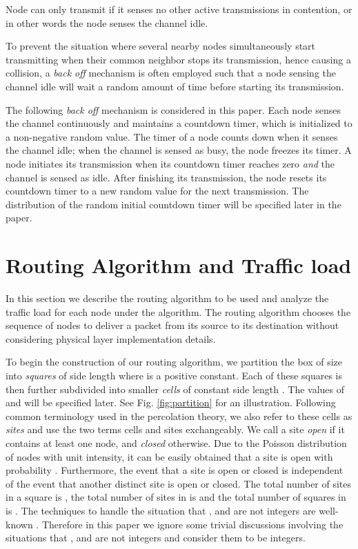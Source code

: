 \documentclass[english]{IEEEtran}
\theoremstyle{plain}
\theoremstyle{plain}
\theoremstyle{plain}
\theoremstyle{remark}
\begin{document}
Node  can only transmit if it senses no other active transmissions
in contention, or in other words the node senses the channel idle. 

To prevent the situation where several nearby nodes simultaneously
start transmitting when their common neighbor stops its transmission,
hence causing a collision, a \emph{back off} mechanism is often employed
such that a node sensing the channel idle will wait a random amount
of time before starting its transmission. 

The following \emph{back off} mechanism is considered in this paper.
Each node senses the channel continuously and maintains a countdown
timer, which is initialized to a non-negative random value. The timer
of a node counts down when it senses the channel idle; when the channel
is sensed as busy, the node freezes its timer. A node initiates its
transmission when its countdown timer reaches zero \emph{and} the
channel is sensed as idle. After finishing its transmission, the node
resets its countdown timer to a new random value for the next transmission.
The distribution of the random initial countdown timer will be specified
later in the paper.


\section{Routing Algorithm and Traffic load\label{sec:Routing Scheme}}

In this section we describe the routing algorithm to be used and analyze
the traffic load for each node under the algorithm. The routing algorithm
chooses the sequence of nodes to deliver a packet from its source
to its destination without considering physical layer implementation
details.

To begin the construction of our routing algorithm, we partition the
box  of size  into \emph{squares}
of side length  where  is a positive constant.
Each of these squares is then further subdivided into smaller \emph{cells}
of constant side length . The values of  and  will
be specified later. See Fig. \ref{fig:partition} for an illustration.
Following common terminology used in the percolation theory, we also
refer to these cells as \emph{sites} and use the two terms cells and
sites exchangeably. We call a site \emph{open} if it contains at least
one node, and \emph{closed} otherwise. Due to the Poisson distribution
of nodes with unit intensity, it can be easily obtained that a site
is open with probability . Furthermore,
the event that a site is open or closed is independent of the event
that another distinct site is open or closed. The total number of
sites in a square is , the
total number of sites in  is 
and the total number of squares in  is .
The techniques to handle the situation that ,
 and  are not
integers are well-known \cite{Franceschetti07Closing}. Therefore
in this paper we ignore some trivial discussions involving the situations
that ,  and 
are not integers and consider them to be integers.
\end{document}
